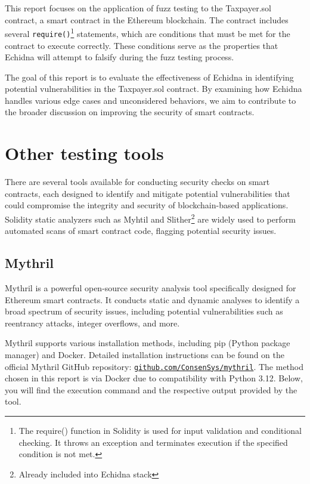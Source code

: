 \documentclass{article}
\begin{document}
This report focuses on the application of fuzz testing to 
the Taxpayer.sol contract, a smart contract in the Ethereum blockchain. 
The contract includes several \texttt{require()}\footnote{The require() function in Solidity is used for input validation and conditional checking. It throws an exception and terminates execution if the specified condition is not met.} statements, which are 
conditions that must be met for the contract to execute correctly. 
These conditions serve as the properties that Echidna will attempt to 
falsify during the fuzz testing process.

The goal of this report is to evaluate the effectiveness of Echidna 
in identifying potential vulnerabilities in the Taxpayer.sol contract. 
By examining how Echidna handles various edge cases and unconsidered 
behaviors, we aim to contribute to the broader discussion on improving 
the security of smart contracts.

\section{Other testing tools}
There are several tools available for conducting security checks on smart contracts, each designed to identify and mitigate potential vulnerabilities that could compromise the integrity and security of blockchain-based applications. Solidity static analyzers such as Myhtil and Slither\footnote{Already included into Echidna stack} are widely used to perform automated scans of smart contract code, flagging potential security issues. 
\subsection{Mythril}
Mythril is a powerful open-source security analysis tool specifically designed for Ethereum smart contracts. It conducts static and dynamic analyses to identify a broad spectrum of security issues, including potential vulnerabilities such as reentrancy attacks, integer overflows, and more.

Mythril supports various installation methods, including pip (Python package manager) and Docker.
Detailed installation instructions can be found on the official Mythril GitHub repository: \texttt{\href{https://github.com/ConsenSys/mythril}{github.com/ConsenSys/mythril}}.
The method chosen in this report is via Docker due to compatibility with Python 3.12.
Below, you will find the execution command and the respective output provided by the tool.
\end{document}
